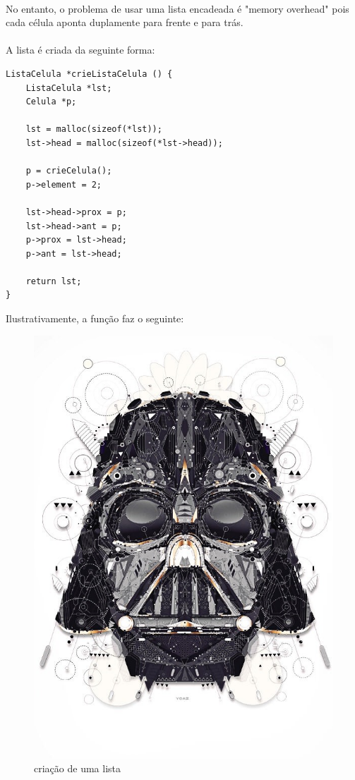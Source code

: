\documentclass[10pt,a4paper]{article}
\begin{document}
		\paragraph*{} No entanto, o problema de usar uma lista encadeada é "memory overhead" pois cada célula aponta duplamente para frente e para trás.
		\paragraph*{} A lista é criada da seguinte forma:
		\begin{lstlisting}
ListaCelula *crieListaCelula () {
    ListaCelula *lst;
    Celula *p;

    lst = malloc(sizeof(*lst));
    lst->head = malloc(sizeof(*lst->head));

    p = crieCelula();
    p->element = 2;

    lst->head->prox = p;
    lst->head->ant = p;
    p->prox = lst->head;
    p->ant = lst->head;

    return lst;
}
		\end{lstlisting}
		Ilustrativamente, a função faz o seguinte:
		
		\begin{figure}[h!]
		  \centering
		    \includegraphics[scale=0.2]{01.jpg}
		  \caption{criação de uma lista}
		\end{figure}
		
\end{document}
